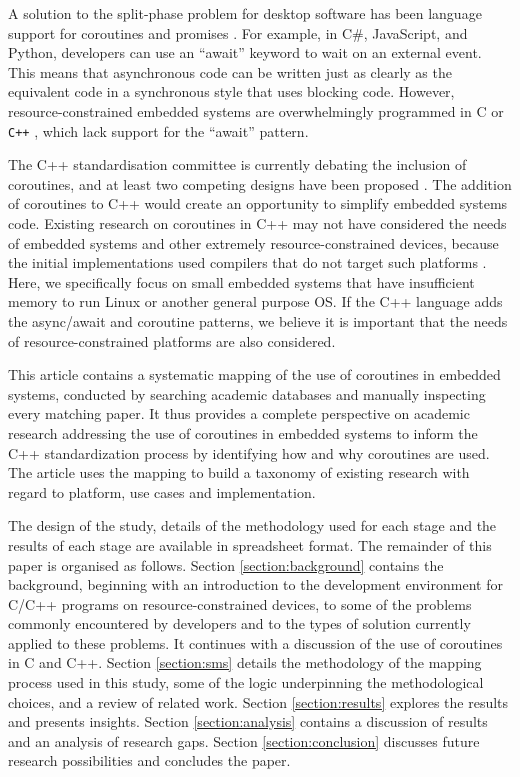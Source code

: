 \documentclass[format=acmsmall, review=false, screen=false]{acmart}
\begin{document}
A solution to the split-phase problem for desktop software has been language support for coroutines \cite{Conway1963, Knuth1968, Marlin1979} and promises \cite{Brodu2015, Liskov1988, Madsen2017}. For example, in C\#, JavaScript, and Python, developers can use an “await” keyword to wait on an external event. This means that asynchronous code can be written just as clearly as the equivalent code in a synchronous style that uses blocking code. However, resource-constrained embedded systems are overwhelmingly programmed in C or \verb!C++! \cite{AspenCore2017, Skerrett2017}, which lack support for the “await” pattern.

The C++ standardisation committee is currently debating the inclusion of coroutines, and at least two competing designs have been proposed \cite{ISO2017, Romer2018}. The addition of coroutines to C++ would create an opportunity to simplify embedded systems code. Existing research on coroutines in C++ may not have considered the needs of embedded systems and other extremely resource-constrained devices, because the initial implementations used compilers that do not target such platforms \cite{Mittelette2015}. Here, we specifically focus on small embedded systems that have insufficient memory to run Linux or another general purpose OS. If the C++ language adds the async/await and coroutine patterns, we believe it is important that the needs of resource-constrained platforms are also considered.

This article contains a systematic mapping of the use of coroutines in embedded systems, conducted by searching academic databases and manually inspecting every matching paper. It thus provides a complete perspective on academic research addressing the use of coroutines in embedded systems to inform the C++ standardization process by identifying how and why coroutines are used. The article uses the mapping to build a taxonomy of existing research with regard to platform, use cases and implementation.

The design of the study, details of the methodology used for each stage and the results of each stage are available in spreadsheet format.
The remainder of this paper is organised as follows. Section \ref{section:background} contains the background, beginning with an introduction to the development environment for C/C++ programs on resource-constrained devices, to some of the problems commonly encountered by developers and to the types of solution currently applied to these problems. It continues with a discussion of the use of coroutines in C and C++. Section \ref{section:sms} details the methodology of the mapping process used in this study, some of the logic underpinning the methodological choices, and a review of related work. Section \ref{section:results} explores the results and presents insights. Section \ref{section:analysis} contains a discussion of results and an analysis of research gaps. Section \ref{section:conclusion} discusses future research possibilities and concludes the paper.
\end{document}
